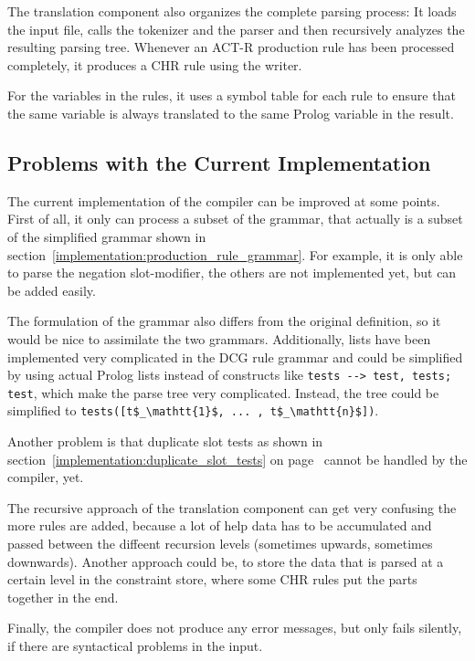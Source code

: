 The translation component also organizes the complete parsing process: It loads the input file, calls the tokenizer and the parser and then recursively analyzes the resulting parsing tree. Whenever an ACT-R production rule has been processed completely, it produces a CHR rule using the writer.

For the variables in the rules, it uses a symbol table for each rule to ensure that the same variable is always translated to the same Prolog variable in the result.

\subsection{Problems with the Current Implementation}
\label{implementation:compiler:problems}

The current implementation of the compiler can be improved at some points. First of all, it only can process a subset of the grammar, that actually is a subset of the simplified grammar shown in section~\ref{implementation:production_rule_grammar}. For example, it is only able to parse the negation slot-modifier, the others are not implemented yet, but can be added easily.

The formulation of the grammar also differs from the original definition, so it would be nice to assimilate the two grammars. Additionally, lists have been implemented very complicated in the DCG rule grammar and could be simplified by using actual Prolog lists instead of constructs like \lstinline|tests --> test, tests; test|, which make the parse tree very complicated. Instead, the tree could be simplified to \lstinline[mathescape]|tests([t$_\mathtt{1}$, ... , t$_\mathtt{n}$])|.

Another problem is that duplicate slot tests as shown in section~\ref{implementation:duplicate_slot_tests} on page~\pageref{implementation:duplicate_slot_tests} cannot be handled by the compiler, yet.

The recursive approach of the translation component can get very confusing the more rules are added, because a lot of help data has to be accumulated and passed between the diffeent recursion levels (sometimes upwards, sometimes downwards). Another approach could be, to store the data that is parsed at a certain level in the constraint store, where some CHR rules put the parts together in the end.

Finally, the compiler does not produce any error messages, but only fails silently, if there are syntactical problems in the input.
